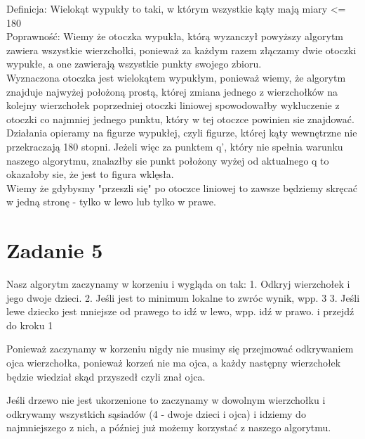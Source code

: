 \documentclass[12pt]{article}
\begin{document}
Definicja: Wielokąt wypukły to taki, w którym wszystkie kąty mają miary <= 180\\

Poprawność:
Wiemy że otoczka wypukła, którą wyzanczył powyższy algorytm zawiera wszystkie wierzchołki, ponieważ za każdym razem złączamy dwie otoczki wypukłe, a one zawierają wszystkie punkty swojego zbioru.\\

Wyznaczona otoczka jest wielokątem wypukłym, ponieważ wiemy, że algorytm znajduje najwyżej położoną prostą, której zmiana jednego z wierzchołków na kolejny wierzchołek poprzedniej otoczki liniowej spowodowałby wykluczenie z otoczki co najmniej jednego punktu, który w tej otoczce powinien sie znajdować.\\

Działania opieramy na figurze wypukłej, czyli figurze, której kąty wewnętrzne nie przekraczają 180 stopni. Jeżeli więc za punktem q', który nie spełnia warunku naszego algorytmu, znalazłby sie punkt położony wyżej od aktualnego q to okazałoby sie, że jest to figura wklęsła.\\

Wiemy że gdybysmy "przeszli się" po otoczce liniowej to zawsze będziemy skręcać w jedną stronę - tylko w lewo lub tylko w prawe.

    

\section{Zadanie 5}


Nasz algorytm zaczynamy w korzeniu i wygląda on tak:
1. Odkryj wierzchołek i jego dwoje dzieci.
2. Jeśli jest to minimum lokalne to zwróc wynik, wpp. 3
3. Jeśli lewe dziecko jest mniejsze od prawego to idź w lewo, wpp. idź w prawo. i przejdź do kroku 1 

Ponieważ zaczynamy w korzeniu nigdy nie musimy się przejmować odkrywaniem ojca wierzchołka, ponieważ korzeń nie ma ojca, a każdy następny wierzchołek będzie wiedział skąd przyszedł czyli znał ojca. 

Jeśli drzewo nie jest ukorzenione to zaczynamy w dowolnym wierzchołku i odkrywamy wszystkich sąsiadów (4 - dwoje dzieci i ojca) i idziemy do najmniejszego z nich, a później już możemy korzystać z naszego algorytmu. 
\end{document}
